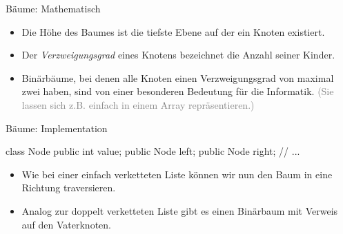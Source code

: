 \begin{frame}{Bäume: Mathematisch}
    \begin{itemize}[<+(1)->]
        \widei
        \item Die Höhe des Baumes ist die tiefste Ebene auf der ein Knoten existiert.
        \item Der \textit{Verzweigungsgrad} eines Knotens bezeichnet die Anzahl seiner Kinder.
        \item Binärbäume, bei denen alle Knoten einen Verzweigungsgrad von maximal zwei haben,\pause{} sind von einer besonderen Bedeutung für die Informatik.\pause{} \textcolor{gray}{(Sie lassen sich z.B. einfach in einem Array repräsentieren.)}
    \end{itemize}
\end{frame}

\begin{frame}[fragile]{Bäume: Implementation}
    \pause{}
    \begin{minipage}{0.4\linewidth}
\small%
\begin{plainjava}
class Node {
    public int value;
    public Node left;
    public Node right;
    // ...
}
\end{plainjava}
    \end{minipage}\hfill{}\pause{}\begin{minipage}{0.55\linewidth}%
\centering{}
\end{minipage}\vfill
    \begin{itemize}[<+(1)->]
        \widei
        \item Wie bei einer einfach verketteten Liste können wir nun den Baum in eine Richtung traversieren.
        \item Analog zur doppelt verketteten Liste gibt es einen Binärbaum mit Verweis auf den Vaterknoten.
    \end{itemize}
\end{frame}

